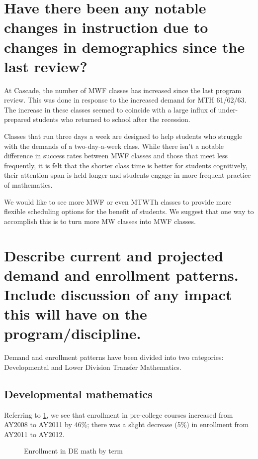 \section[Changes in instruction due to changes in demographics]{Have there been
 any notable changes in instruction due to changes in
demographics since the last review?}
At Cascade, the number of MWF classes has increased since the last program
review. This was done in response to the increased demand for MTH 61/62/63. The
increase in these classes seemed to coincide with a large influx of
under-prepared students who returned to school after the recession.

Classes that run three days a week are designed to help students who struggle
with the demands of a two-day-a-week class.  While there isn't a notable
difference in success rates between MWF classes and those that meet less
frequently, it is felt that the shorter class time is better for students
cognitively, their attention span is held longer and students engage in more
frequent practice of mathematics.

We would like to see more MWF or even MTWTh classes to provide more flexible
scheduling options for the benefit of students. We suggest that one way to
accomplish this is to turn more MW classes into MWF classes.

\section[Demand and enrollment patterns]{Describe current and projected demand
 and enrollment patterns.
Include discussion of any impact this will have on the program/discipline. }
Demand and enrollment patterns have been divided into two categories:
Developmental and Lower Division Transfer Mathematics.

\subsection{Developmental mathematics}
Referring to \cref{needs:fig:enrollmentDevelopTerm}, we see that
enrollment in pre-college courses increased from AY2008 to AY2011 by 46\%;
there was a slight decrease (5\%) in enrollment from AY2011 to AY2012.

\begin{figure}[!htb]
	\centering
	
	\caption{Enrollment in DE math by term}
	\label{needs:fig:enrollmentDevelopTerm}
\end{figure}

